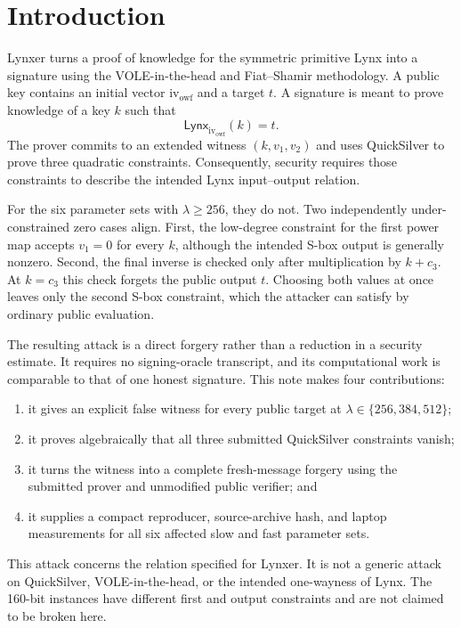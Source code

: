 \documentclass[11pt,a4paper]{article}
\newcommand{\Lynx}{\mathsf{Lynx}}
\begin{document}
\section{Introduction}

Lynxer turns a proof of knowledge for the symmetric primitive Lynx into a signature using
the VOLE-in-the-head and Fiat--Shamir methodology.  A public key contains an initial vector
$\mathrm{iv}_{\mathrm{owf}}$ and a target $t$.  A signature is meant to prove knowledge of a key
$k$ such that
\[
  \Lynx_{\mathrm{iv}_{\mathrm{owf}}}(k)=t.
\]
The prover commits to an extended witness $(k,v_1,v_2)$ and uses QuickSilver to prove three
quadratic constraints.  Consequently, security requires those constraints to describe the
intended Lynx input--output relation.

For the six parameter sets with $\lambda\geq256$, they do not.  Two independently
under-constrained zero cases align.  First, the low-degree constraint for the first power map accepts
$v_1=0$ for every $k$, although the intended S-box output is generally nonzero.  Second,
the final inverse is checked only after multiplication by $k+c_3$.  At $k=c_3$ this check
forgets the public output $t$.  Choosing both values at once leaves only the second S-box
constraint, which the attacker can satisfy by ordinary public evaluation.

The resulting attack is a direct forgery rather than a reduction in a security estimate.
It requires no signing-oracle transcript, and its computational work is comparable to that
of one honest signature.  This note makes four contributions:
\begin{enumerate}[leftmargin=1.7em]
  \item it gives an explicit false witness for every public target at
        $\lambda\in\{256,384,512\}$;
  \item it proves algebraically that all three submitted QuickSilver constraints vanish;
  \item it turns the witness into a complete fresh-message forgery using the submitted
        prover and unmodified public verifier; and
  \item it supplies a compact reproducer, source-archive hash, and laptop measurements for
        all six affected slow and fast parameter sets.
\end{enumerate}

This attack concerns the relation specified for Lynxer.  It is not a generic attack on
QuickSilver, VOLE-in-the-head, or the intended one-wayness of Lynx.  The 160-bit instances
have different first and output constraints and are not claimed to be broken here.
\end{document}
